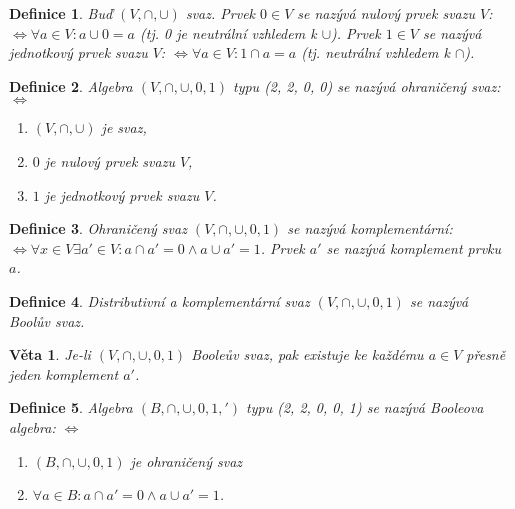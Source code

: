 \documentclass[a4paper, 11pt]{report}
\newtheorem{mydef}{Definice}[chapter]
\newtheorem{veta}{Věta}
\begin{document}
\begin{mydef}
Buď $(V, \cap, \cup)$ svaz.
Prvek $0 \in V$ se nazývá \emph{nulový prvek svazu $V$}: $\Leftrightarrow \forall a \in V: a \cup 0 = a$ (tj. 0 je neutrální vzhledem k $\cup$).
Prvek $1 \in V$ se nazývá \emph{jednotkový prvek svazu $V$}: $\Leftrightarrow \forall a \in V: 1 \cap a = a$ (tj. neutrální vzhledem k $\cap$).
\end{mydef}

\begin{mydef}
Algebra $(V, \cap, \cup, 0, 1)$ typu (2, 2, 0, 0) se nazývá \emph{ohraničený svaz}: $\Leftrightarrow$
\begin{enumerate}[1)]
	\item $(V, \cap, \cup)$ je svaz,
	\item $0$ je nulový prvek svazu $V$,
	\item $1$ je jednotkový prvek svazu $V$.
\end{enumerate}
\end{mydef}

\begin{mydef}
Ohraničený svaz $(V, \cap, \cup, 0, 1)$ se nazývá komplementární: $\Leftrightarrow \forall x \in V \exists a' \in V: a \cap a' = 0 \land a \cup a' = 1$. Prvek $a'$ se nazývá \emph{komplement} prvku $a$.
\end{mydef}

\begin{mydef}
Distributivní a komplementární svaz $(V, \cap, \cup, 0, 1)$ se nazývá Boolův svaz.
\end{mydef}

\begin{veta}
Je-li $(V, \cap, \cup, 0, 1)$ Booleův svaz, pak existuje ke každému $a \in V$ přesně jeden komplement $a'$.
\end{veta}

\begin{mydef}
Algebra $(B, \cap, \cup, 0, 1, ')$ typu (2, 2, 0, 0, 1) se nazývá Booleova algebra: $\Leftrightarrow$
\begin{enumerate}[1)]
	\item $(B, \cap, \cup, 0, 1)$ je ohraničený svaz
	\item $\forall a \in B: a \cap a' = 0 \land a \cup a' = 1$.
\end{enumerate}
\end{mydef}
\end{document}
